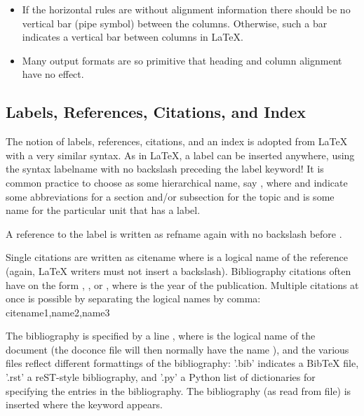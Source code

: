 \documentclass[%
oneside,                 %
final,                   %
chapterprefix=true,      %
open=right               %
10pt]{book}
\begin{document}
{\begin{itemize}
 \item If the horizontal rules are without alignment information there should
   be no vertical bar (pipe symbol) between the columns. Otherwise, such
   a bar indicates a vertical bar between columns in {\LaTeX}.

 \item Many output formats are so primitive that heading and column alignment
   have no effect.
\end{itemize}

\noindent

\subsection{Labels, References, Citations, and Index}

The notion of labels, references, citations, and an index is adopted
from {\LaTeX} with a very similar syntax. As in {\LaTeX}, a label can be
inserted anywhere, using the syntax
\bccq
label{name}
\eccq
with no backslash
preceding the label keyword! It is common practice to choose 
as some hierarchical name, say , where  and  indicate
some abbreviations for a section and/or subsection for the topic and
 is some name for the particular unit that has a label.

A reference to the label  is written as
\bccq
ref{name}
\eccq
again with no backslash before .

Single citations are written as
\bccq
cite{name}
\eccq
where  is a logical name
of the reference (again, {\LaTeX} writers must not insert a backslash).
Bibliography citations often have  on the form
, , or , where
 is the year of the publication.
Multiple citations at once is possible by separating the logical names
by comma:
\bccq
cite{name1,name2,name3}
\eccq

The bibliography is specified by a line , where  is the logical name of the
document (the doconce file will then normally have the name
), and the various files reflect different formattings of
the bibliography: '.bib' indicates a BibTeX file, '.rst' a reST-style
bibliography, and '.py' a Python list of dictionaries for specifying
the entries in the bibliography. The bibliography (as read from file)
is inserted where the  keyword appears.

}
\end{document}
